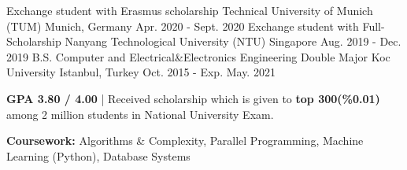 \begin{cventries}

\cventry
    {Exchange student with Erasmus scholarship }
    {Technical University of Munich (TUM)} %
    {Munich, Germany} %
    {Apr. 2020 - Sept. 2020} %
    {}
\vspace{-4mm}
\cventry
    {Exchange student with Full-Scholarship}
    {Nanyang Technological University (NTU)} %
    {Singapore} %
    {Aug. 2019 - Dec. 2019} %
    {}
\vspace{-4mm}
  \cventry
    {B.S. Computer and Electrical\&Electronics Engineering Double Major} %
    {Koc University } %
    {Istanbul, Turkey} %
    {Oct. 2015 - Exp. May. 2021} %
    {
      \begin{cvitems} %
        \item {\textbf{GPA 3.80 / 4.00} | Received scholarship which is given to \textbf{top 300(\%0.01)} among 2 million students in National University Exam.}
        \item {\textbf{Coursework:} Algorithms \& Complexity, Parallel Programming, Machine Learning (Python), Database Systems}
      \end{cvitems}
    } 
\vspace{2mm}    
\end{cventries}
